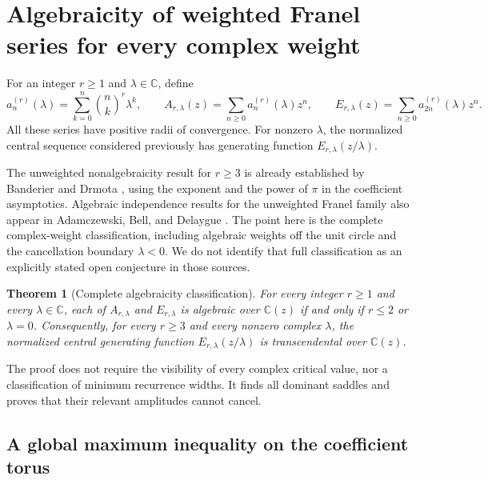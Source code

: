 \documentclass[11pt,a4paper]{article}
\newtheorem{theorem}{Theorem}[section]
\theoremstyle{definition}
\theoremstyle{remark}
\numberwithin{equation}{section}
\begin{document}
\clearpage



\section{Algebraicity of weighted Franel series for every complex weight}
\label{p5:sec:WF-algebraicity}

For an integer $r\ge1$ and $\lambda\in\mathbb C$, define
\[
 a_n^{(r)}(\lambda)=\sum_{k=0}^n\binom nk^r\lambda^k,\qquad
 A_{r,\lambda}(z)=\sum_{n\ge0}a_n^{(r)}(\lambda)z^n,\qquad
 E_{r,\lambda}(z)=\sum_{n\ge0}a_{2n}^{(r)}(\lambda)z^n.
\]
All these series have positive radii of convergence. For nonzero
$\lambda$, the normalized central sequence considered previously has
generating function $E_{r,\lambda}(z/\lambda)$.

The unweighted nonalgebraicity result for $r\ge3$ is already established
by Banderier and Drmota \cite[Proposition 7]{p5:BD2015}, using the exponent
and the power of $\pi$ in the coefficient asymptotics. Algebraic
independence results for the unweighted Franel family also appear in
Adamczewski, Bell, and Delaygue \cite[Theorem 9.8]{p5:ABD2019}.
The point here is the complete complex-weight classification, including
algebraic weights off the unit circle and the cancellation boundary
$\lambda<0$. We do not identify that full classification as an explicitly
stated open conjecture in those sources.

\begin{theorem}[Complete algebraicity classification]
\label{p5:thm:WF-classification}
For every integer $r\ge1$ and every $\lambda\in\mathbb C$, each of
$A_{r,\lambda}$ and $E_{r,\lambda}$ is algebraic over $\mathbb C(z)$
if and only if $r\le2$ or $\lambda=0$.
Consequently, for every $r\ge3$ and every nonzero complex $\lambda$,
the normalized central generating function $E_{r,\lambda}(z/\lambda)$
is transcendental over $\mathbb C(z)$.
\end{theorem}

The proof does not require the visibility of every complex critical
value, nor a classification of minimum recurrence widths. It finds all
dominant saddles and proves that their relevant amplitudes cannot cancel.

\subsection{A global maximum inequality on the coefficient torus}
\end{document}
